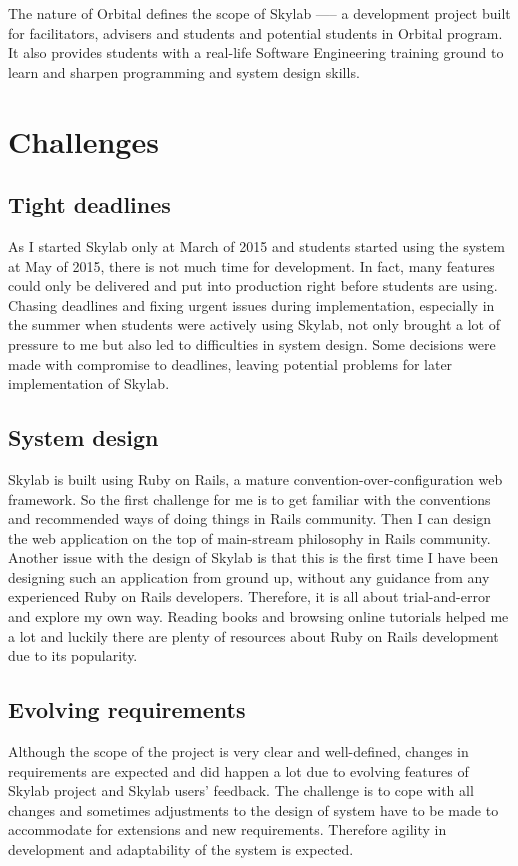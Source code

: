 The nature of Orbital defines the scope of Skylab —-- a development project built for facilitators, advisers and students and potential students in Orbital program. It also provides students with a real-life Software Engineering training ground to learn and sharpen programming and system design skills.

\section{Challenges}

\subsection{Tight deadlines}
As I started Skylab only at March of 2015 and students started using the system at May of 2015, there is not much time for development. In fact, many features could only be delivered and put into production right before students are using. Chasing deadlines and fixing urgent issues during implementation, especially in the summer when students were actively using Skylab, not only brought a lot of pressure to me but also led to difficulties in system design. Some decisions were made with compromise to deadlines, leaving potential problems for later implementation of Skylab.

\subsection{System design}
Skylab is built using Ruby on Rails, a mature convention-over-configuration web framework. So the first challenge for me is to get familiar with the conventions and recommended ways of doing things in Rails community. Then I can design the web application on the top of main-stream philosophy in Rails community. Another issue with the design of Skylab is that this is the first time I have been designing such an application from ground up, without any guidance from any experienced Ruby on Rails developers. Therefore, it is all about trial-and-error and explore my own way. Reading books and browsing online tutorials helped me a lot and luckily there are plenty of resources about Ruby on Rails development due to its popularity.

\subsection{Evolving requirements}
Although the scope of the project is very clear and well-defined, changes in requirements are expected and did happen a lot due to evolving features of Skylab project and Skylab users' feedback. The challenge is to cope with all changes and sometimes adjustments to the design of system have to be made to accommodate for extensions and new requirements. Therefore agility in development and adaptability of the system is expected.

